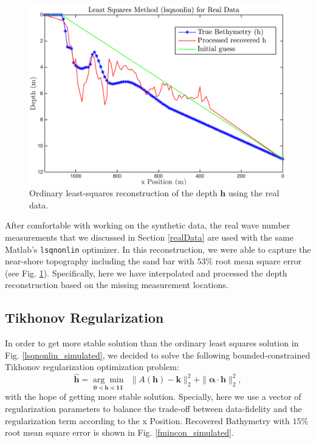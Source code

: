 \begin{figure}[H]
\center
\includegraphics[scale=0.6]{img/lsqnonlin_real_data_oct09.png} %
\caption{Ordinary least-squares reconstruction of the depth $\mathbf{h}$ using the real data.}
\label{lsqnonlin_real}
\end{figure}

After comfortable with working on the synthetic data, the real wave number measurements that we discussed in Section \ref{realData} are used with the same Matlab's \verb|lsqnonlin| optimizer. In this reconstruction, we were able to capture the near-shore topography including the sand bar with $53\%$ root mean square error (see Fig. \ref{lsqnonlin_real}). Specifically, here we have interpolated and processed the depth reconstruction based on the missing measurement locations. 


\subsection{Tikhonov Regularization} \label{TickReg}

In order to get more stable solution than the ordinary least squares solution in Fig. \ref{lsqnonlin_simulated}, we decided to solve the following bounded-constrained Tikhonov regularization optimization problem:
\begin{equation}\label{LS-regBC}
\mathbf{\hat{h}} = \underset{\mathbf{0} \preceq \mathbf{h} \preceq \mathbf{11}}{\arg \min} \ \ \|  A(\mathbf{h}) -  \mathbf{k} \|_2^2  +   \| \boldsymbol{\alpha} \cdot  \mathbf{h}\|_2^2,
\end{equation}
with the hope of getting more stable solution. Specially, here we use a vector of regularization parameters to balance the trade-off between data-fidelity and the regularization term according to the x Position. Recovered Bathymetry with $15\%$ root mean square error is shown in Fig. \ref{fmincon_simulated}. 
 
